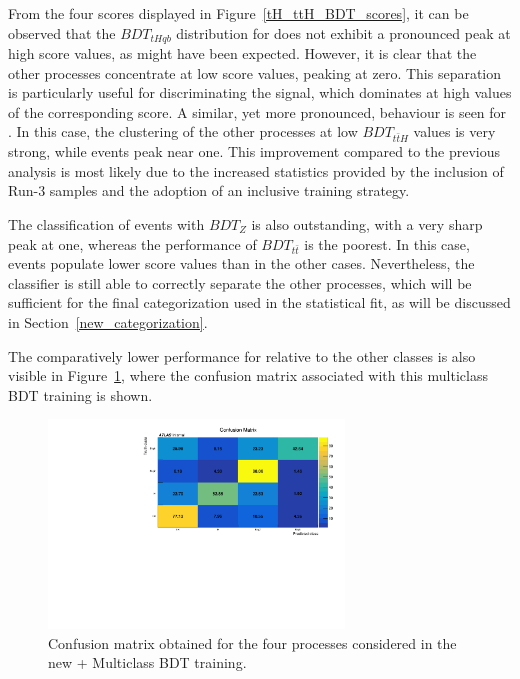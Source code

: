 From the four scores displayed in Figure~\ref{tH_ttH_BDT_scores}, it can be observed that the $BDT_{tHqb}$ distribution for \thqb does not exhibit a pronounced peak at high score values, as might have been expected. However, it is clear that the other processes concentrate at low score values, peaking at zero. This separation is particularly useful for discriminating the \thqb signal, which dominates at high values of the corresponding score. A similar, yet more pronounced, behaviour is seen for \tth. In this case, the clustering of the other processes at low $BDT_{t\bar{t}H}$ values is very strong, while \ttH events peak near one. This improvement compared to the previous analysis is most likely due to the increased statistics provided by the inclusion of Run-3 samples and the adoption of an inclusive training strategy.

The classification of \ztautau events with $BDT_{Z}$ is also outstanding, with a very sharp peak at one, whereas the performance of $BDT_{t\bar{t}}$ is the poorest. In this case, \ttbar events populate lower score values than in the other cases. Nevertheless, the classifier is still able to correctly separate the other processes, which will be sufficient for the final categorization used in the statistical fit, as will be discussed in Section~\ref{new_categorization}.

The comparatively lower performance for \ttbar relative to the other classes is also visible in Figure~\ref{confusion}, where the confusion matrix associated with this multiclass BDT training is shown.

\begin{figure}[htbp]
  \centering
  \includegraphics[width=0.7\textwidth]{images/plots_tH_tHqb_for_thesis/ConfusionMatrix.pdf}
    \caption{Confusion matrix obtained for the four processes considered in the new \thqb + \ttH Multiclass BDT training.}
    \label{confusion}
  \end{figure}
